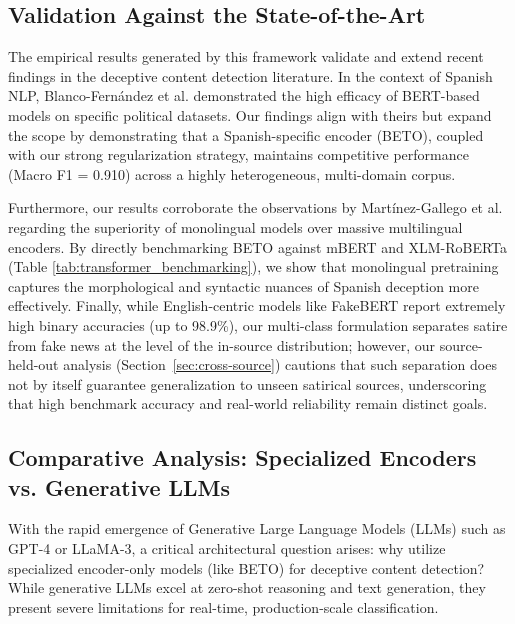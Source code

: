 \documentclass[informatics,article,accept,pdftex,moreauthors]{Definitions/mdpi}
\begin{document}
\subsection{Validation Against the State-of-the-Art}
The empirical results generated by this framework validate and extend recent findings in the deceptive content detection literature. In the context of Spanish NLP, Blanco-Fernández et al. \citep{blanco2024enhancing} demonstrated the high efficacy of BERT-based models on specific political datasets. Our findings align with theirs but expand the scope by demonstrating that a Spanish-specific encoder (BETO), coupled with our strong regularization strategy, maintains competitive performance (Macro F1 = 0.910) across a highly heterogeneous, multi-domain corpus. 

Furthermore, our results corroborate the observations by Martínez-Gallego et al. \citep{martinez2021fake} regarding the superiority of monolingual models over massive multilingual encoders. By directly benchmarking BETO against mBERT and XLM-RoBERTa (Table \ref{tab:transformer_benchmarking}), we show that monolingual pretraining captures the morphological and syntactic nuances of Spanish deception more effectively. Finally, while English-centric models like FakeBERT \citep{kaliyar2021fakebert} report extremely high binary accuracies (up to 98.9\%), our multi-class formulation separates satire from fake news at the level of the in-source distribution; however, our source-held-out analysis (Section~\ref{sec:cross-source}) cautions that such separation does not by itself guarantee generalization to unseen satirical sources, underscoring that high benchmark accuracy and real-world reliability remain distinct goals.

\subsection{Comparative Analysis: Specialized Encoders vs. Generative LLMs}
With the rapid emergence of Generative Large Language Models (LLMs) such as GPT-4 or LLaMA-3, a critical architectural question arises: why utilize specialized encoder-only models (like BETO) for deceptive content detection? While generative LLMs excel at zero-shot reasoning and text generation, they present severe limitations for real-time, production-scale classification. 
\end{document}
